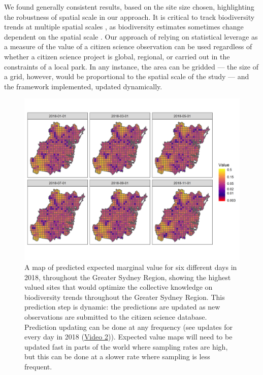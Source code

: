 \documentclass[9pt,twocolumn,twoside,lineno]{pnas-new}
\begin{document}
We found generally consistent results, based on the site size chosen, highlighting the robustness of spatial scale in our approach. It is critical to track biodiversity trends at multiple spatial scales \cite{soberon2007assessing}, as biodiversity estimates sometimes change dependent on the spatial scale \cite{chase2013scale}. Our approach of relying on statistical leverage as a measure of the value of a citizen science observation can be used regardless of whether a citizen science project is global, regional, or carried out in the constraints of a local park. In any instance, the area can be gridded --- the size of a grid, however, would be proportional to the spatial scale of the study --- and the framework implemented, updated dynamically.

\begin{figure}[!hb]
\centering
\includegraphics[width=.8\linewidth]{example_maps.png}
\caption{A map of predicted expected marginal value for six different days in 2018, throughout the Greater Sydney Region, showing the highest valued sites that would optimize the collective knowledge on biodiversity trends throughout the Greater Sydney Region. This prediction step is dynamic: the predictions are updated as new observations are submitted to the citizen science database. Prediction updating can be done at any frequency (see updates for every day in 2018 (\href{https://github.com/coreytcallaghan/optimize_citizen_science_obs/blob/master/Figures/dynamic_map.gif}{Video 2})).  Expected value maps will need to be updated fast in parts of the world where sampling rates are high, but this can be done at a slower rate where sampling is less frequent.}
\label{fig3}
\end{figure}
\end{document}

